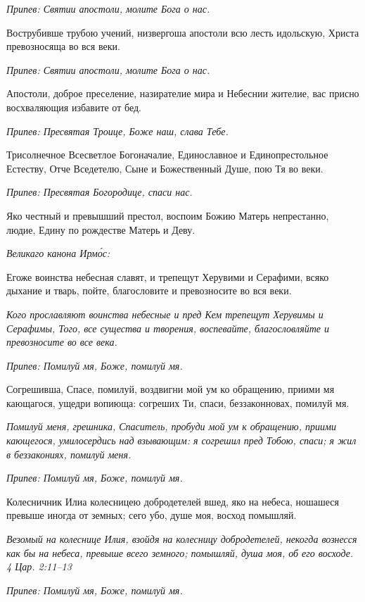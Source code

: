 \itshape Припев:\normalfont{} Святии апостоли, молите Бога о нас.


Вострубивше трубою учений, низвергоша апостоли всю лесть идольскую, Христа превозносяща во вся веки.


\itshape Припев:\normalfont{} Святии апостоли, молите Бога о нас.


Апостоли, доброе преселение, назирателие мира и Небеснии жителие, вас присно восхваляющия избавите от бед.


\itshape Припев:\normalfont{} Пресвятая Троице, Боже наш, слава Тебе.


Трисолнечное Всесветлое Богоначалие, Единославное и Единопрестольное Естеству, Отче Вседетелю, Сыне и Божественный Душе, пою Тя во веки.


\itshape Припев:\normalfont{} Пресвятая Богородице, спаси нас.


Яко честный и превышший престол, воспоим Божию Матерь непрестанно, людие, Едину по рождестве Матерь и Деву.


\itshape Великаго канона Ирмо́с:\normalfont{}


Егоже воинства небесная славят, и трепещут Херувими и Серафими, всяко дыхание и тварь, пойте, благословите и превозносите во вся веки.


\itshape Кого прославляют воинства небесные и пред Кем трепещут Херувимы и Серафимы, Того, все существа и творения, воспевайте, благословляйте и превозносите во все века.\normalfont{}


\itshape Припев:\normalfont{} Помилуй мя, Боже, помилуй мя.


Согрешивша, Спасе, помилуй, воздвигни мой ум ко обращению, приими мя кающагося, ущедри вопиюща: согреших Ти, спаси, беззаконновах, помилуй мя.


\itshape Помилуй меня, грешника, Спаситель, пробуди мой ум к обращению, приими кающегося, умилосердись над взывающим: я согрешил пред Тобою, спаси; я жил в беззакониях, помилуй меня.\normalfont{}


\itshape Припев:\normalfont{} Помилуй мя, Боже, помилуй мя.


Колесничник Илиа колесницею добродетелей вшед, яко на небеса, ношашеся превыше иногда от земных; сего убо, душе моя, восход помышляй.


\itshape Везомый на колеснице Илия, взойдя на колесницу добродетелей, некогда вознесся как бы на небеса, превыше всего земного; помышляй, душа моя, об его восходе. 4 Цар. 2:11–13\normalfont{}


\itshape Припев:\normalfont{} Помилуй мя, Боже, помилуй мя.


